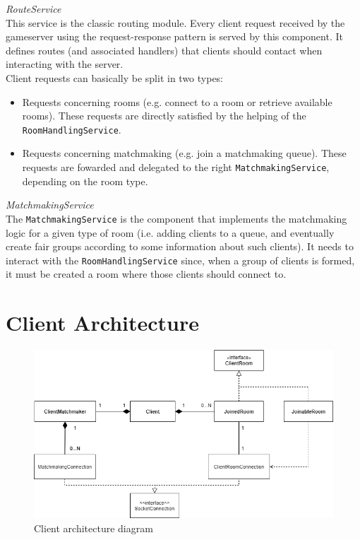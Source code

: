 \bigskip
\textit{RouteService}
\\
This service is the classic routing module.
Every client request received by the gameserver using the request-response pattern is served by this component.
It defines routes (and associated handlers) that clients should contact when interacting with the server.
\\
Client requests can basically be split in two types:
\begin{itemize}
	\item Requests concerning rooms (e.g. connect to a room or retrieve available rooms). These requests are directly satisfied by the helping of the \texttt{RoomHandlingService}.
	\item Requests concerning matchmaking (e.g. join a matchmaking queue). These requests are fowarded and delegated to the right \texttt{MatchmakingService}, depending on the room type.
\end{itemize}

\bigskip
\textit{MatchmakingService}
\\
The \texttt{MatchmakingService} is the component that implements the matchmaking logic for a given type of room (i.e. adding clients to a queue, and eventually create fair groups according to some information about such clients). It needs to interact with the \texttt{RoomHandlingService} since, when a group of clients is formed, it must be created a room where those clients should connect to.


\section{Client Architecture}

\begin{figure}[H]
	\centering
	\includegraphics[scale=0.65]{images/3-architecture/client-architecture.png}
	\caption{Client architecture diagram}
	\label{fig:client_architecture}
\end{figure}


